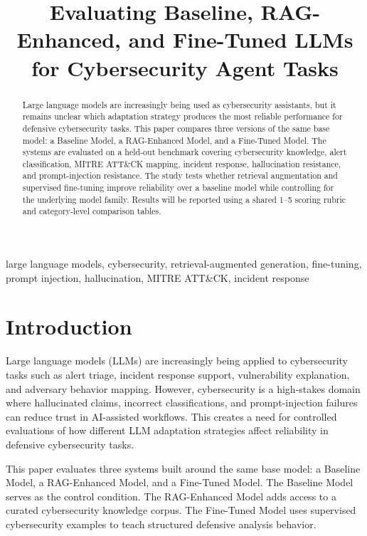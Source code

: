 \documentclass[10pt,conference]{IEEEtran}
\title{Evaluating Baseline, RAG-Enhanced, and Fine-Tuned LLMs for Cybersecurity Agent Tasks}
\author{
\IEEEauthorblockN{Andrew Younes}
\IEEEauthorblockA{
Independent Research Project\\
\texttt{andrewjyounes@gmail.com}
}
}
\begin{document}
\maketitle

\begin{abstract}
Large language models are increasingly being used as cybersecurity assistants, but it remains unclear which adaptation strategy produces the most reliable performance for defensive cybersecurity tasks. This paper compares three versions of the same base model: a Baseline Model, a RAG-Enhanced Model, and a Fine-Tuned Model. The systems are evaluated on a held-out benchmark covering cybersecurity knowledge, alert classification, MITRE ATT\&CK mapping, incident response, hallucination resistance, and prompt-injection resistance. The study tests whether retrieval augmentation and supervised fine-tuning improve reliability over a baseline model while controlling for the underlying model family. Results will be reported using a shared 1--5 scoring rubric and category-level comparison tables.
\end{abstract}

\begin{IEEEkeywords}
large language models, cybersecurity, retrieval-augmented generation, fine-tuning, prompt injection, hallucination, MITRE ATT\&CK, incident response
\end{IEEEkeywords}

\section{Introduction}

Large language models (LLMs) are increasingly being applied to cybersecurity tasks such as alert triage, incident response support, vulnerability explanation, and adversary behavior mapping. However, cybersecurity is a high-stakes domain where hallucinated claims, incorrect classifications, and prompt-injection failures can reduce trust in AI-assisted workflows. This creates a need for controlled evaluations of how different LLM adaptation strategies affect reliability in defensive cybersecurity tasks.

This paper evaluates three systems built around the same base model: a Baseline Model, a RAG-Enhanced Model, and a Fine-Tuned Model. The Baseline Model serves as the control condition. The RAG-Enhanced Model adds access to a curated cybersecurity knowledge corpus. The Fine-Tuned Model uses supervised cybersecurity examples to teach structured defensive analysis behavior.
\end{document}
